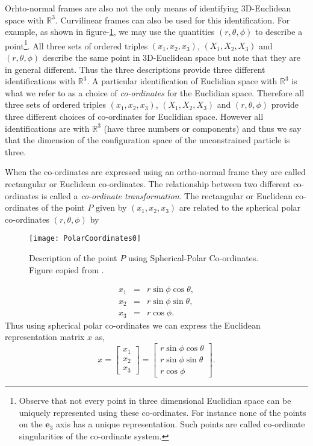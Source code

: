 \documentclass[graybox,envcountchap,sectrefs]{svmonoMuga}
\begin{document}
Orhto-normal frames are also not the only means of identifying 3D-Euclidean space with $\mathbb{R}^3$. Curvilinear frames can also be used for this identification. For example, as 
shown in figure-\ref{Fig:SphericalPolar}, we may use the quantities $(r,\theta,\phi)$ to describe a point\footnote{Observe that not every point in three dimensional Euclidian space can 
be uniquely represented using these co-ordinates. For instance none of the points on the $\mathbf{e}_3$ axis has a unique representation. Such points are called co-ordinate singularities of 
the co-ordinate system.}.
All three sets of ordered triples $(x_1,x_2,x_3)$, $(X_1,X_2,X_3)$ and $(r,\theta,\phi)$ describe the same point in 3D-Euclidean space but note that they are in general different. Thus the three descriptions 
provide three different identifications with $\mathbb{R}^3$. A particular identification of Euclidian space with $\mathbb{R}^3$
is what we refer to as a choice of \textit{co-ordinates} for the Euclidian space. Therefore all three sets of ordered triples $(x_1,x_2,x_3)$, $(X_1,X_2,X_3)$ and $(r,\theta,\phi)$ provide 
three different choices of co-ordinates for Euclidian space. However all identifications are with $\mathbb{R}^3$ (have three numbers or components) and thus we say that the 
dimension of the configuration space of the unconstrained particle is three.

When the co-ordinates are expressed using an ortho-normal frame they are called rectangular or Euclidean co-ordinates. The relationship between two different co-ordinates is 
called a \textit{co-ordinate transformation}. The rectangular or Euclidean co-ordinates of the point $P$ given by $(x_1,x_2,x_3)$ are related to the spherical polar co-ordinates $(r,\theta,\phi)$ by
\begin{figure}[ht]
\begin{center}
\texttt{[image: PolarCoordinates0]}
\renewcommand{\baselinestretch}{1}\selectfont
\caption{Description of the point $P$ using Spherical-Polar Co-ordinates. Figure copied from \cite{Greenwood}.}
\label{Fig:SphericalPolar}
\renewcommand{\baselinestretch}{1.5}\selectfont
\end{center}
\end{figure}
\begin{eqnarray*}
x_1 &=& r\sin{\phi}\cos{\theta},\\
x_2 &=& r\sin{\phi}\sin{\theta},\\
x_3 &=& r\cos{\phi}.
\end{eqnarray*}
Thus using spherical polar co-ordinates we can express the Euclidean representation matrix $x$ as,
\[x=
\left[ \begin{array}{c} x_1\\ x_2\\ x_3 \end{array} \right]=\left[ \begin{array}{c} r\sin{\phi}\cos{\theta}\\r\sin{\phi}\sin{\theta}\\r\cos{\phi} \end{array} \right].
\]
\end{document}
